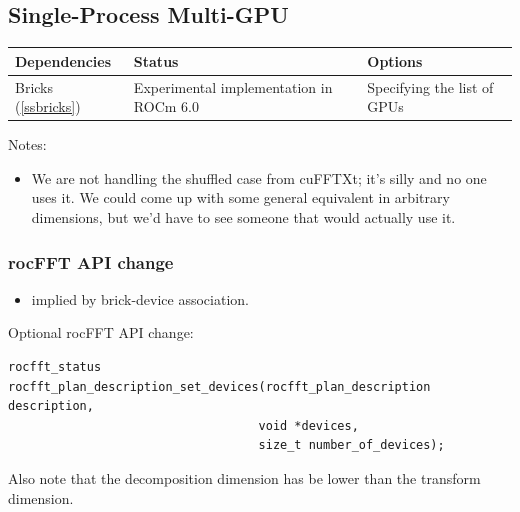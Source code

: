 \documentclass[12pt]{article}
\renewcommand{\(}{\left(}
\renewcommand{\)}{\right)}
\begin{document}
\newpage
\subsection{Single-Process Multi-GPU}


\begin{center}
  \begin{tabular}{|l|l|l|}
    \hline
    Dependencies & Status & Options \\
    \hline
    Bricks (\ref{ssbricks}) & Experimental implementation in ROCm 6.0 & Specifying the list of GPUs \\
    \hline
  \end{tabular}
\end{center}

Notes:
\begin{itemize}
\item We are not handling the shuffled case from cuFFTXt; it's silly
  and no one uses it.  We could come up with some general equivalent
  in arbitrary dimensions, but we'd have to see someone that would
  actually use it.
\end{itemize}

   



\subsubsection{rocFFT API change}
\begin{itemize}
\item implied by brick-device association.
\end{itemize}
Optional rocFFT API change:
\begin{lstlisting}
rocfft_status
rocfft_plan_description_set_devices(rocfft_plan_description description,
                                   void *devices,
                                   size_t number_of_devices);
\end{lstlisting}
Also note that the decomposition dimension has be lower than the
transform dimension.

\noindent
\end{document}
